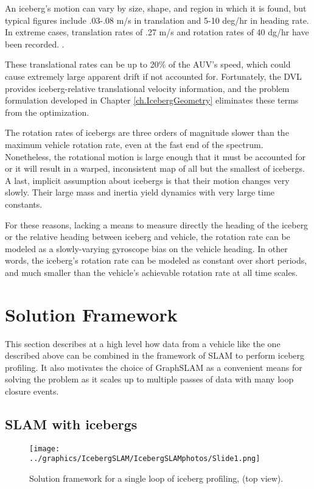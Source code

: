 An iceberg's motion can vary by size, shape, and region in which it is found, but typical figures include .03-.08 m/s in translation  and 5-10 deg/hr in heading rate. In extreme cases, translation rates of .27 m/s and rotation rates of 40 dg/hr have been recorded. \cite{?} \cite{?}. 

These translational rates can be up to 20\% of the AUV's speed, which could cause extremely large apparent drift if not accounted for. Fortunately, the DVL provides iceberg-relative translational velocity information, and the problem formulation developed in Chapter \ref{ch.IcebergGeometry} eliminates these terms from the optimization.

The rotation rates of icebergs are three orders of magnitude slower than the maximum vehicle rotation rate, even at the fast end of the spectrum. Nonetheless, the rotational motion is large enough that it must be accounted for or it will result in a warped, inconsistent map of all but the smallest of icebergs. A last, implicit assumption about icebergs is that their motion changes very slowly. Their large mass and inertia yield dynamics with very large time constants. 

For these reasons, lacking a means to measure directly the heading of the iceberg or the relative heading between iceberg and vehicle, the rotation rate can be modeled as a slowly-varying gyroscope bias on the vehicle heading. In other words, the iceberg's rotation rate can be modeled as constant over short periods, and much smaller than the vehicle's achievable rotation rate at all time scales.

\section{Solution Framework}

This section describes at a high level how data from a vehicle like the one described above can be combined in the framework of SLAM to perform iceberg profiling. It also motivates the choice of GraphSLAM as a convenient means for solving the problem as it scales up to multiple passes of data with many loop closure events.

\subsection{SLAM with icebergs}

\begin{figure}[htb]
   \centering
   \texttt{[image: ../graphics/IcebergSLAM/IcebergSLAMphotos/Slide1.png]} %
   \caption{Solution framework for a single loop of iceberg profiling, (top view). }
   \label{fig:icebergSLAM}
\end{figure}

